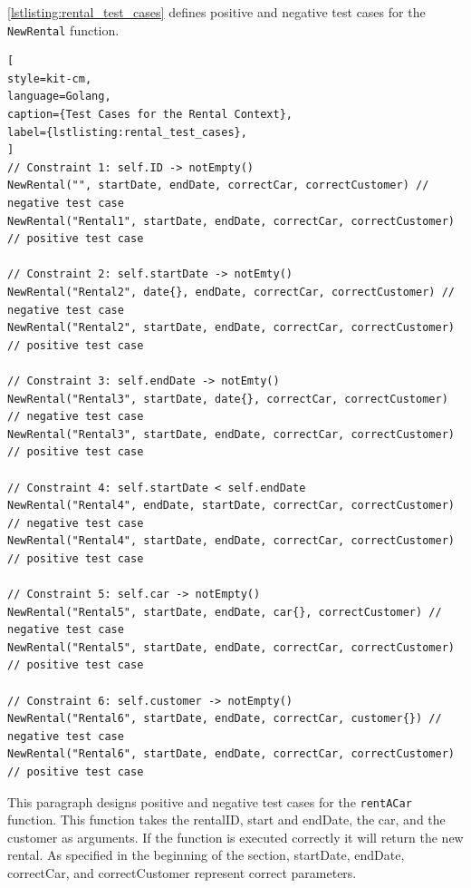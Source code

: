 \autoref{lstlisting:rental_test_cases} defines positive and negative test cases for the \texttt{NewRental} function.
\begin{lstlisting}[
style=kit-cm,
language=Golang,
caption={Test Cases for the Rental Context},
label={lstlisting:rental_test_cases},
]
// Constraint 1: self.ID -> notEmpty()
NewRental("", startDate, endDate, correctCar, correctCustomer) // negative test case
NewRental("Rental1", startDate, endDate, correctCar, correctCustomer) // positive test case

// Constraint 2: self.startDate -> notEmty()
NewRental("Rental2", date{}, endDate, correctCar, correctCustomer) // negative test case
NewRental("Rental2", startDate, endDate, correctCar, correctCustomer) // positive test case

// Constraint 3: self.endDate -> notEmty()
NewRental("Rental3", startDate, date{}, correctCar, correctCustomer) // negative test case
NewRental("Rental3", startDate, endDate, correctCar, correctCustomer) // positive test case

// Constraint 4: self.startDate < self.endDate
NewRental("Rental4", endDate, startDate, correctCar, correctCustomer) // negative test case
NewRental("Rental4", startDate, endDate, correctCar, correctCustomer) // positive test case

// Constraint 5: self.car -> notEmpty()
NewRental("Rental5", startDate, endDate, car{}, correctCustomer) // negative test case
NewRental("Rental5", startDate, endDate, correctCar, correctCustomer) // positive test case

// Constraint 6: self.customer -> notEmpty()
NewRental("Rental6", startDate, endDate, correctCar, customer{}) // negative test case
NewRental("Rental6", startDate, endDate, correctCar, correctCustomer) // positive test case
\end{lstlisting}
  
This paragraph designs positive and negative test cases for the \texttt{rentACar\(\)} function.
This function takes the rentalID, start and endDate, the car, and the customer as arguments.
If the function is executed correctly it will return the new rental.
As specified in the beginning of the section, startDate, endDate, correctCar, and correctCustomer represent correct parameters.

